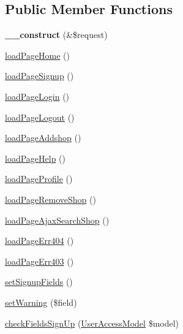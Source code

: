 \subsection*{Public Member Functions}
\begin{DoxyCompactItemize}
\item 
\hypertarget{classBasePageController_a483998015a3518d49897d271de2e3c2d}{{\bfseries \+\_\+\+\_\+construct} (\&\$request)}\label{classBasePageController_a483998015a3518d49897d271de2e3c2d}

\item 
\hyperlink{classBasePageController_a66084d1db3fcc8a5cb1f44cd82b7948a}{load\+Page\+Home} ()
\item 
\hyperlink{classBasePageController_aae6760084899d261e8f19f8dc2cbfd30}{load\+Page\+Signup} ()
\item 
\hyperlink{classBasePageController_a36cdd7c6a038c2664b333fbf8de6383a}{load\+Page\+Login} ()
\item 
\hyperlink{classBasePageController_ae7d620e0d251d06407cfe960cafe3d57}{load\+Page\+Logout} ()
\item 
\hyperlink{classBasePageController_aecf3ccde53aaa9b780feb5e12f2904ea}{load\+Page\+Addshop} ()
\item 
\hyperlink{classBasePageController_ae7ecc6f491f580059698d1a1a8e8d9ac}{load\+Page\+Help} ()
\item 
\hyperlink{classBasePageController_affa5617be55ed9bf233fd7bd1b2e19c9}{load\+Page\+Profile} ()
\item 
\hyperlink{classBasePageController_ad63921678e571dbd0a37d3afd6b55f5a}{load\+Page\+Remove\+Shop} ()
\item 
\hyperlink{classBasePageController_a96ace79928e80d29e6560b1fb965e859}{load\+Page\+Ajax\+Search\+Shop} ()
\item 
\hyperlink{classBasePageController_a07d3e03b8e2ec5cc698f057a3496c14b}{load\+Page\+Err404} ()
\item 
\hyperlink{classBasePageController_a9ecd03fb676ab32ee9c2cb4e412757cc}{load\+Page\+Err403} ()
\item 
\hyperlink{classBasePageController_a877c4f32b7d39e566f7832aef94c2f11}{set\+Signup\+Fields} ()
\item 
\hyperlink{classBasePageController_a777f34065716ce7f7706ea745fbdd254}{set\+Warning} (\$field)
\item 
\hyperlink{classBasePageController_a56e85dfb915144831cf39435b88774f5}{check\+Fields\+Sign\+Up} (\hyperlink{classUserAccessModel}{User\+Access\+Model} \$model)
\item 

\end{DoxyCompactItemize}
